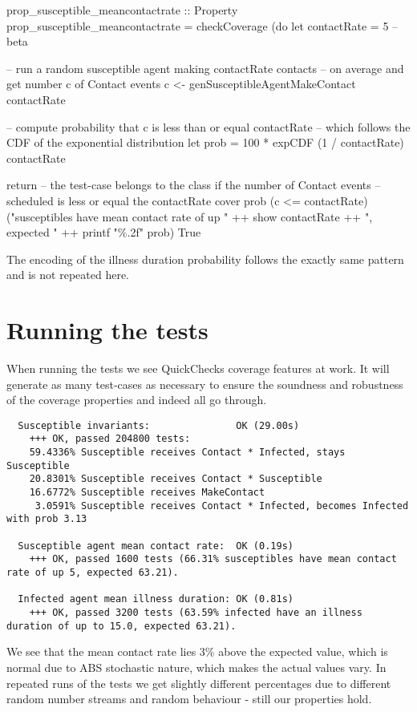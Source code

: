 \begin{HaskellCode}
prop_susceptible_meancontactrate :: Property
prop_susceptible_meancontactrate = checkCoverage (do
  let contactRate = 5 -- beta
  
  -- run a random susceptible agent making contactRate contacts
  -- on average and get number c of Contact events
  c <- genSusceptibleAgentMakeContact contactRate

  -- compute probability that c is less than or equal contactRate
  -- which follows the CDF of the exponential distribution
  let prob = 100 * expCDF (1 / contactRate) contactRate

  return
    -- the test-case belongs to the class if the number of Contact events
    -- scheduled is less or equal the contactRate
    cover prob (c <= contactRate) 
      ("susceptibles have mean contact rate of up " ++ show contactRate ++ 
        ", expected " ++ printf "\%.2f" prob)  True
\end{HaskellCode}

The encoding of the illness duration probability follows the exactly same pattern and is not repeated here.

\section{Running the tests}
When running the tests we see QuickChecks coverage features at work. It will generate as many test-cases as necessary to ensure the soundness and robustness of the coverage properties and indeed all go through.

\begin{verbatim}
  Susceptible invariants:               OK (29.00s)
    +++ OK, passed 204800 tests:
    59.4336% Susceptible receives Contact * Infected, stays Susceptible
    20.8301% Susceptible receives Contact * Susceptible
    16.6772% Susceptible receives MakeContact
     3.0591% Susceptible receives Contact * Infected, becomes Infected with prob 3.13
     
  Susceptible agent mean contact rate:  OK (0.19s)
    +++ OK, passed 1600 tests (66.31% susceptibles have mean contact rate of up 5, expected 63.21).
    
  Infected agent mean illness duration: OK (0.81s)
    +++ OK, passed 3200 tests (63.59% infected have an illness duration of up to 15.0, expected 63.21).
\end{verbatim}

We see that the mean contact rate lies 3\% above the expected value, which is normal due to ABS stochastic nature, which makes the actual values vary. In repeated runs of the tests we get slightly different percentages due to different random number streams and random behaviour - still our properties hold.


